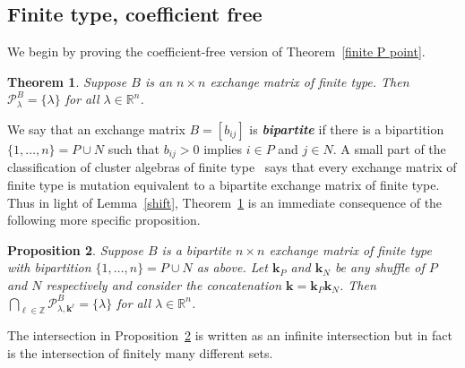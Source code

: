 \documentclass[10pt]{article}
\newtheorem{proposition}{Proposition}[section]
\newtheorem{theorem}[proposition]{Theorem}
\theoremstyle{definition}
\theoremstyle{remark}
\numberwithin{equation}{section}
\newcommand{\newword}[1]{\textbf{\emph{#1}}}
\newcommand{\integers}{\mathbb Z}
\newcommand{\reals}{\mathbb R}
\newcommand{\set}[1]{{\lbrace #1 \rbrace}}
\newcommand{\0}{{\mathbf{0}}}
\newcommand{\kk}{{\boldsymbol{k}}}
\renewcommand{\P}{\mathcal{P}}
\begin{document}
\subsection{Finite type, coefficient free}
We begin by proving the coefficient-free version of Theorem~\ref{finite P point}.

\begin{theorem}\label{finite P point no}  
Suppose $B$ is an $n\times n$ exchange matrix of finite type.
Then  ${\P^B_\lambda=\set{\lambda}}$ for all $\lambda\in\reals^n$.
\end{theorem}

We say that an exchange matrix $B=[b_{ij}]$ is \newword{bipartite} if there is a bipartition $\set{1,\ldots,n}=P\cup N$ such that $b_{ij}>0$ implies $i\in P$ and $j\in N$.
A small part of the classification of cluster algebras of finite type~\cite{ca2} says that every exchange matrix of finite type is mutation equivalent to a bipartite exchange matrix of finite type.
Thus in light of Lemma~\ref{shift}, Theorem~\ref{finite P point no} is an immediate consequence of the following more specific proposition.


\begin{proposition}\label{finite P point bip}
  Suppose $B$ is a bipartite $n\times n$ exchange matrix of finite type with bipartition $\set{1,\ldots,n}=P\cup N$ as above.
  Let $\kk_P$ and $\kk_N$ be any shuffle of $P$ and $N$ respectively and consider the concatenation $\kk=\kk_P \kk_N$.
  Then $\bigcap_{\ell\in\integers}\P^B_{\lambda,\kk^\ell}=\set{\lambda}$ for all $\lambda\in\reals^n$.
\end{proposition}

The intersection in Proposition~\ref{finite P point bip} is written as an infinite intersection but in fact is the intersection of finitely many different sets.
\end{document}
